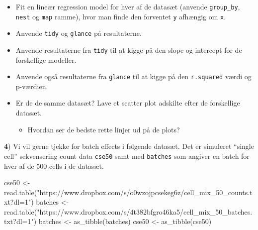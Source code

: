 \documentclass[
]{book}
\newenvironment{Shaded}{\begin{snugshade}}{\end{snugshade}}
\newcommand{\FunctionTok}[1]{\textcolor[rgb]{0.00,0.00,0.00}{#1}}
\newcommand{\NormalTok}[1]{#1}
\newcommand{\OtherTok}[1]{\textcolor[rgb]{0.56,0.35,0.01}{#1}}
\newcommand{\StringTok}[1]{\textcolor[rgb]{0.31,0.60,0.02}{#1}}
\providecommand{\tightlist}{%
  \setlength{\itemsep}{0pt}\setlength{\parskip}{0pt}}
\begin{document}
\begin{itemize}
\item
  Fit en lineær regression model for hver af de datasæt (anvende \texttt{group\_by}, \texttt{nest} og \texttt{map} ramme), hvor man finde den forventet \texttt{y} afhængig om \texttt{x}.
\item
  Anvende \texttt{tidy} og \texttt{glance} på resultaterne.
\item
  Anvende resultaterne fra \texttt{tidy} til at kigge på den slope og intercept for de forskellige modeller.
\item
  Anvende også resultaterne fra \texttt{glance} til at kigge på den \texttt{r.squared} værdi og p-værdien.
\item
  Er de de samme datasæt? Lave et scatter plot adskilte efter de forskellige datasæt.

  \begin{itemize}
  \tightlist
  \item
    Hvordan ser de bedste rette linjer ud på de plots?
  \end{itemize}
\end{itemize}

\textbf{4}) Vi vil gerne tjekke for batch effects i følgende datasæt. Det er simuleret ``single cell'' sekvensering count data \texttt{cse50} samt med \texttt{batches} som angiver en batch for hver af de 500 cells i de datasæt.

\begin{Shaded}
\begin{Highlighting}[]
\NormalTok{cse50 }\OtherTok{\textless{}{-}} \FunctionTok{read.table}\NormalTok{(}\StringTok{"https://www.dropbox.com/s/o0wzojpcsekeg6z/cell\_mix\_50\_counts.txt?dl=1"}\NormalTok{)}
\NormalTok{batches }\OtherTok{\textless{}{-}} \FunctionTok{read.table}\NormalTok{(}\StringTok{"https://www.dropbox.com/s/4t382bfgro46ka5/cell\_mix\_50\_batches.txt?dl=1"}\NormalTok{)}
\NormalTok{batches }\OtherTok{\textless{}{-}} \FunctionTok{as\_tibble}\NormalTok{(batches)}
\NormalTok{cse50 }\OtherTok{\textless{}{-}} \FunctionTok{as\_tibble}\NormalTok{(cse50)}
\end{Highlighting}
\end{Shaded}
\end{document}
